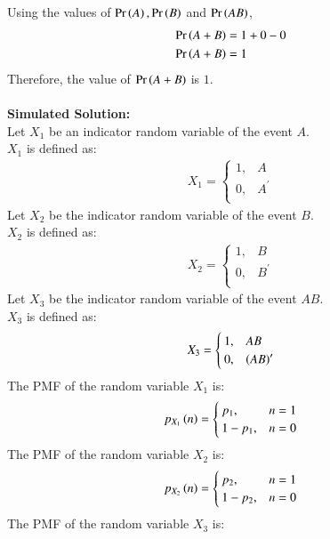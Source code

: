 \documentclass[journal]{IEEEtran}
\begin{document}
Using the values of $\Pr\left(A\right), \Pr\left(B\right)$ and $\Pr\left(AB\right)$,
\begin{align}
	\Pr\left(A + B\right) &= 1 + 0- 0\\
	\Pr\left(A + B\right) &= 1
\end{align}
Therefore, the value of $\Pr\left(A + B\right)$ is $1$.\\\\   

\textbf{Simulated Solution:\\}
Let $X_1$ be an indicator random variable of the event $A$.\\
$X_1$ is defined as:
\begin{align}
	X_1 =
	\begin{cases}
		1 ,& A\\
		0 ,& A^\prime\\
	\end{cases}
\end{align}
Let $X_2$ be the indicator random variable of the event $B$.\\
$X_2$ is defined as:
\begin{align}
	X_2 =
	\begin{cases}
		1 ,& B\\
		0 ,& B^\prime\\
	\end{cases}
\end{align}
Let $X_3$ be the indicator random variable of the event $AB$.\\
$X_3$ is defined as:
\begin{align}
	X_3 =
	\begin{cases}
		1 ,& AB\\
		0 ,& \left(AB\right)^\prime\\
	\end{cases}
\end{align}
The PMF of the random variable $X_1$ is:
\begin{align}
	p_{X_1}\left(n\right) =
	\begin{cases}
		p_1 ,& n = 1\\
		1 - p_1 ,& n = 0
	\end{cases}
\end{align}
The PMF of the random variable $X_2$ is:
\begin{align}
	p_{X_2}\left(n\right) =
	\begin{cases}
		p_2 ,& n = 1\\
		1 - p_2 ,& n = 0
	\end{cases}
\end{align}
The PMF of the random variable $X_3$ is:
\end{document}
